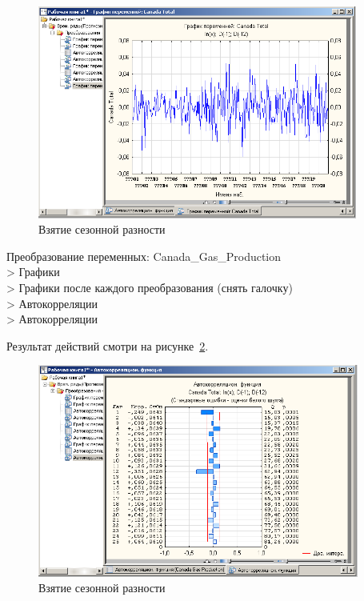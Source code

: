 \begin{figure}[!h]
  \centering

  \includegraphics[height=7cm]
  {inc/Canada_Gas_Production/8.PNG}

  \caption{Взятие сезонной разности}

  \label{fig:2_8}
\end{figure}

Преобразование переменных: Canada\_Gas\_Production\\
> Графики\\
> Графики после каждого преобразования (снять галочку)\\
> Автокорреляции\\
> Автокорреляции

Результат действий смотри на рисунке~\ref{fig:2_9}.

\begin{figure}[!h]
  \centering

  \includegraphics[height=7cm]
  {inc/Canada_Gas_Production/9.PNG}

  \caption{Взятие сезонной разности}

  \label{fig:2_9}
\end{figure}

